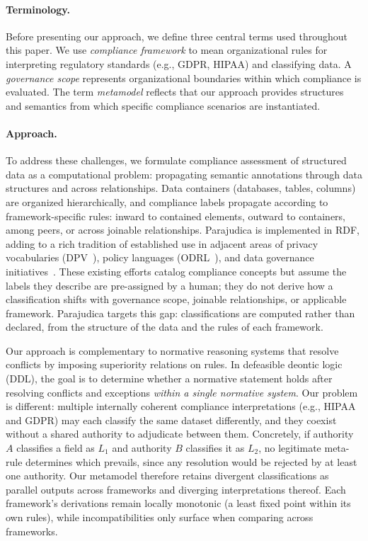 \documentclass[runningheads,oneside]{llncs}
\begin{document}
\paragraph{Terminology.}
Before presenting our approach, we define three central terms used throughout this paper. We use \emph{compliance framework} to mean organizational rules for interpreting regulatory standards (e.g., GDPR, HIPAA) and classifying data. A \emph{governance scope} represents organizational boundaries within which compliance is evaluated. The term \emph{metamodel} reflects that our approach provides structures and semantics from which specific compliance scenarios are instantiated.

\paragraph{Approach.}
To address these challenges, we formulate compliance assessment of structured data as a computational problem: propagating semantic annotations through data structures and across relationships. Data containers (databases, tables, columns) are organized hierarchically, and compliance labels propagate according to framework-specific rules: inward to contained elements, outward to containers, among peers, or across joinable relationships. Parajudica is implemented in RDF, adding to a rich tradition of established use in adjacent areas of privacy vocabularies (DPV~\cite{pandit2019dpv}), policy languages (ODRL~\cite{odrl-model-2018,odrl-vocab-2018}), and data governance initiatives~\cite{bader2020}. These existing efforts catalog compliance concepts but assume the labels they describe are pre-assigned by a human; they do not derive how a classification shifts with governance scope, joinable relationships, or applicable framework. Parajudica targets this gap: classifications are computed rather than declared, from the structure of the data and the rules of each framework.

Our approach is complementary to normative reasoning systems that resolve conflicts by imposing superiority relations on rules. In defeasible deontic logic (DDL), the goal is to determine whether a normative statement holds after resolving conflicts and exceptions \emph{within a single normative system}. Our problem is different: multiple internally coherent compliance interpretations (e.g., HIPAA and GDPR) may each classify the same dataset differently, and they coexist without a shared authority to adjudicate between them. Concretely, if authority $A$ classifies a field as $L_1$ and authority $B$ classifies it as $L_2$, no legitimate meta-rule determines which prevails, since any resolution would be rejected by at least one authority. Our metamodel therefore retains divergent classifications as parallel outputs across frameworks and diverging interpretations thereof. Each framework's derivations remain locally monotonic (a least fixed point within its own rules), while incompatibilities only surface when comparing across frameworks.
\end{document}
